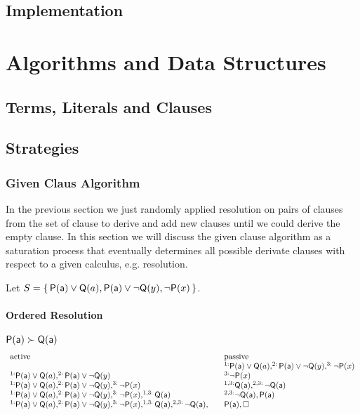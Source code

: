 
\section{Implementation}

\chapter{Algorithms and Data Structures}

\section{Terms, Literals and Clauses}

\section{Strategies}


\subsection{Given Claus Algorithm}

In the previous section we just randomly applied resolution 
on pairs of clauses from the set of clause 
to derive and add new clauses 
until we could derive the empty clause.
In this section we will discuss the given clause algorithm 
as a saturation process that eventually determines all possible derivate clauses
with respect to a given calculus, e.g. resolution.


Let $S=\{\, {\mathsf P}({\mathsf a})\lor{\mathsf Q}(a), {\mathsf P}({\mathsf a})\lor\lnot{\mathsf Q}(y), \lnot{\mathsf P}(x) \,\}$.

\subsubsection{Ordered Resolution}

\begin{example}
	${\mathsf P}({\mathsf a})\succ{\mathsf Q}({\mathsf a})$
	\begin{gather*}
	\begin{array}{lll}
	\text{active} & & \text{passive} \\
	&& ^{1:}{\mathsf P}({\mathsf a})\lor{\mathsf Q}(a), ^{2:}{\mathsf P}({\mathsf a})\lor\lnot{\mathsf Q}(y), ^{3:}\lnot{\mathsf P}(x) \\
	^{1:}{\mathsf P}({\mathsf a})\lor{\mathsf Q}(a), ^{2:}{\mathsf P}({\mathsf a})\lor\lnot{\mathsf Q}(y)& & ^{3:}\lnot{\mathsf P}(x) \\
	^{1:}{\mathsf P}({\mathsf a})\lor{\mathsf Q}(a), ^{2:}{\mathsf P}({\mathsf a})\lor\lnot{\mathsf Q}(y), ^{3:}\lnot{\mathsf P}(x)&  & ^{1,3:}{\mathsf Q}({\mathsf a}), ^{2,3:}\lnot{\mathsf Q}({\mathsf a}) \\
	^{1:}{\mathsf P}({\mathsf a})\lor{\mathsf Q}(a), ^{2:}{\mathsf P}({\mathsf a})\lor\lnot{\mathsf Q}(y), ^{3:}\lnot{\mathsf P}(x), ^{1,3:}{\mathsf Q}({\mathsf a})&  & ^{2,3:}\lnot{\mathsf Q}({\mathsf a}), {\mathsf P}({\mathsf a}) \\
	^{1:}{\mathsf P}({\mathsf a})\lor{\mathsf Q}(a), ^{2:}{\mathsf P}({\mathsf a})\lor\lnot{\mathsf Q}(y), ^{3:}\lnot{\mathsf P}(x), ^{1,3:}{\mathsf Q}({\mathsf a}), ^{2,3:}\lnot{\mathsf Q}({\mathsf a}), &  & {\mathsf P}({\mathsf a}), \square \\
	\end{array}
	\end{gather*}
\end{example}

